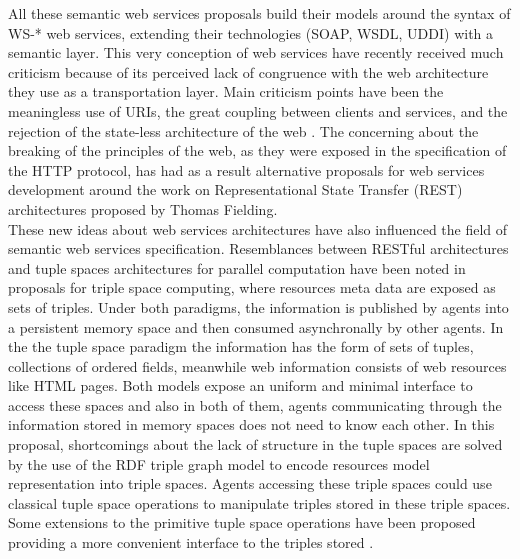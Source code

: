 All these semantic web services proposals build their models around the syntax of WS-* web services, extending their
technologies (SOAP, WSDL, UDDI) with a semantic layer. This very conception of web services have recently received much
criticism because of its perceived lack of congruence with the web architecture they use as a transportation layer. Main criticism points
have been the meaningless use of URIs, the great coupling between clients and services, and the rejection
of the state-less architecture of the web \cite{FieldingTaylor02toit}. The concerning about the breaking of the principles of the web, as
they were exposed in the specification of the HTTP protocol, has had as a result alternative proposals for web services
development  around the work on Representational State Transfer (REST) \cite{Fiel00} architectures
proposed by Thomas Fielding. \\

These new ideas about web services architectures have also influenced the field of semantic web services
specification. Resemblances between RESTful architectures and tuple spaces architectures for parallel computation have
been noted \cite{Fensel04triple-spacecomputing:} in proposals for triple space computing, where resources meta data are
exposed as sets of triples. Under both paradigms, the information is published by agents into a persistent memory space  and then consumed asynchronally
by other agents. In the the tuple space paradigm the information has the form of sets of tuples, collections of ordered
fields, meanwhile web information consists of web resources like HTML pages. Both models expose an uniform and minimal interface to access these spaces and also in both of them, agents communicating through the information stored in memory spaces does not need to know each other. In this proposal, shortcomings about the lack of structure in the tuple spaces \cite{journals/jss/JohansonF04} are solved by
the use of the RDF triple graph model \cite{Hayes:04:RS} to encode resources model representation into triple spaces. Agents
accessing these triple spaces could use classical tuple space operations to manipulate triples stored in these
triple spaces. Some extensions to the primitive tuple space operations have been proposed providing a more convenient interface to the
triples stored \cite{Simperl07acoordination}.

